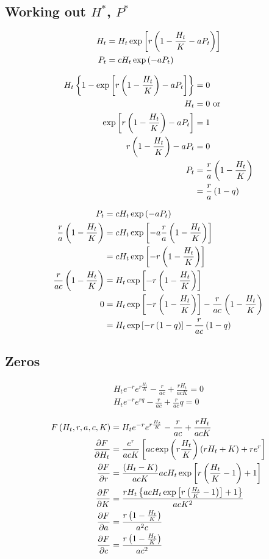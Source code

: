 \documentclass{article}
\begin{document}
\subsection{Working out $H^*$, $P^*$}
\begin{align*}
    H_t &= H_t \exp\left[r\left(1-\frac{H_t}{K}-a P_t\right)\right]\\
    P_t &= cH_t \exp\left(-aP_t\right)
\end{align*}

\begin{align*}
    H_t\left\{1 - \exp\left[r\left(1-\frac{H_t}{K}\right) - aP_t\right]\right\} &= 0\\
    H_t &= 0 \text{ or}\\
    \exp\left[r\left(1-\frac{H_t}{K}\right) - aP_t\right] &= 1\\
    r\left(1-\frac{H_t}{K}\right) - aP_t &= 0\\
    P_t &= \frac{r}{a}\left(1-\frac{H_t}{K}\right)\\
        &= \frac{r}{a}\left(1-q\right)
\end{align*}

\begin{align*}
    P_t &= c H_t \exp\left(-aP_t\right)\\
    \frac{r}{a}\left(1-\frac{H_t}{K}\right) &= c H_t \exp\left[-a \frac{r}{a}\left(1-\frac{H_t}{K}\right)\right]\\
    &= c H_t \exp\left[-r\left(1-\frac{H_t}{K}\right)\right]\\
    \frac{r}{ac}\left(1-\frac{H_t}{K}\right) &= H_t \exp\left[-r\left(1-\frac{H_t}{K}\right)\right]\\
    0 &= H_t\exp\left[-r\left(1-\frac{H_t}{K}\right)\right] - \frac{r}{ac}\left(1-\frac{H_t}{K}\right)\\
      &= H_t\exp\left[-r\left(1-q\right)\right]-\frac{r}{ac}\left(1-q\right)
\end{align*}

\subsection{Zeros}

\begin{align*}
    H_te^{-r}e^{r\frac{H_t}{K}} - \frac{r}{ac} + \frac{rH_t}{acK} = 0\\
    H_te^{-r}e^{rq} - \frac{r}{ac} + \frac{r}{ac} q = 0
\end{align*}

\begin{align*}
    F\left(H_t, r, a, c, K\right) &= H_te^{-r}e^{r\frac{H_t}{K}}-\frac{r}{ac}+\frac{rH_t}{acK}\\
    \frac{\partial F}{\partial H_t} &= \frac{e^r}{acK} \left[ a c \exp\left(r \frac{H_t}{K}\right)\left(r H_t + K\right) + r e^r\right]\\
    \frac{\partial F}{\partial r} &= \frac{\left(H_t - K\right)}{acK} acH_t\exp\left[r\left(\frac{H_t}{K} - 1\right)+1\right]\\
    \frac{\partial F}{\partial K} &= \frac{r H_t \left\{a c H_t \exp\left[r\left(\frac{H_t}{K}-1\right)\right] + 1\right\}}{acK^2}\\
    \frac{\partial F}{\partial a} &= \frac{r\left(1-\frac{H_t}{K}\right)}{a^2c}\\
    \frac{\partial F}{\partial c} &= \frac{r\left(1-\frac{H_t}{K}\right)}{ac^2}
\end{align*}
\end{document}
